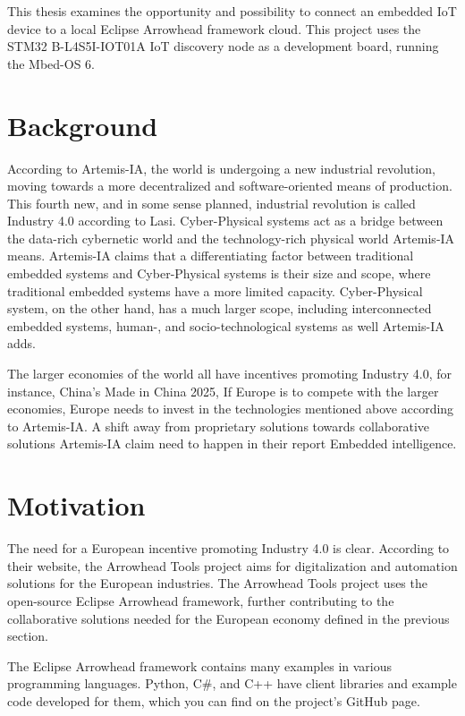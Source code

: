 This thesis examines the opportunity and possibility to connect an embedded IoT device to a local Eclipse Arrowhead framework cloud.
This project uses the STM32 B-L4S5I-IOT01A IoT discovery node as a development board, running the Mbed-OS 6. 
\section{Background}
According to Artemis-IA, the world is undergoing a new industrial revolution, moving towards a more decentralized and software-oriented means of production\cite{Artemis2021}.
This fourth new, and in some sense planned, industrial revolution is called Industry 4.0 according to Lasi\cite{Lasi2014}. 
Cyber-Physical systems act as a bridge between the data-rich cybernetic world and the technology-rich physical world Artemis-IA means\cite{Artemis2021}.
Artemis-IA claims that a differentiating factor between traditional embedded systems and Cyber-Physical systems is their size and scope, where traditional embedded systems have a more limited capacity.
Cyber-Physical system, on the other hand, has a much larger scope, including interconnected embedded systems, human-, and socio-technological systems as well Artemis-IA adds.

The larger economies of the world all have incentives promoting Industry 4.0, for instance, China’s Made in China 2025,
If Europe is to compete with the larger economies,  Europe needs to invest in the technologies mentioned above according to Artemis-IA\cite{Artemis2021}.
A shift away from proprietary solutions towards collaborative solutions  Artemis-IA claim need to happen in their report Embedded intelligence. 

\section{Motivation}
The need for a European incentive promoting Industry 4.0 is clear. 
According to their website, the Arrowhead Tools project aims for digitalization and automation solutions for the European industries\cite{AT2021}.
The Arrowhead Tools project uses the open-source Eclipse Arrowhead framework, further contributing to the collaborative solutions needed for the European economy defined in the previous section.

The Eclipse Arrowhead framework contains many examples in various programming languages.
Python, C\#, and C++ have client libraries and example code developed for them, which you can find on the project’s GitHub page.\cite{AC2021} 


